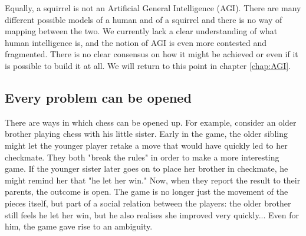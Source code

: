 Equally, a squirrel is not an Artificial General Intelligence (AGI). There are many different possible models of a human and of a squirrel and there is no way of mapping between the two. We currently lack a clear understanding of what human intelligence is, and the notion of AGI is even more contested and fragmented. There is no clear consensus on how it might be achieved or even if it is possible to build it at all. We will return to this point in chapter \ref{chap:AGI}.




\subsection{Every problem can be opened}




There are ways in which chess can be opened up. For example, consider an older brother playing chess with his little sister. Early in the game, the older sibling might let the younger player retake a move that would have quickly led to her checkmate. They both "break the rules" in order to make a more interesting game. If the younger sister later goes on to place her brother in checkmate, he might remind her that "he let her win." Now, when they report the result to their parents, the outcome is open. The game is no longer just the movement of the pieces itself, but part of a social relation between the players: the older brother still feels he let her win, but he also realises she improved very quickly... Even for him, the game gave rise to an ambiguity. 
